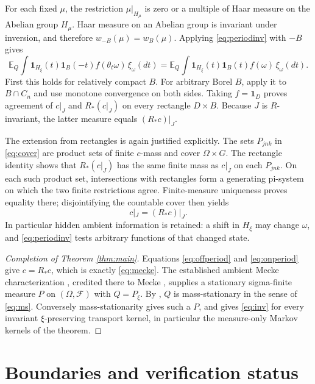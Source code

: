 \documentclass[11pt]{article}
\newcommand{\FF}{\mathcal F}
\newcommand{\ind}{\mathbf 1}
\newcommand{\EQ}{\mathbb E_Q}
\begin{document}
For each fixed $\mu$, the restriction $\mu|_{H_\mu}$ is zero or a multiple of Haar measure on the Abelian group $H_\mu$. Haar measure on an Abelian group is invariant under inversion, and therefore $w_{-B}(\mu)=w_B(\mu)$. Applying \eqref{eq:periodinv} with $-B$ gives
\begin{equation}
 \EQ\int\ind_{H_\xi}(t)\ind_B(-t)f(\theta_t\omega)\,\xi_\omega(dt)
 =\EQ\int\ind_{H_\xi}(t)\ind_B(t)f(\omega)\,\xi_\omega(dt). \label{eq:periodrect}
\end{equation}
First this holds for relatively compact $B$. For arbitrary Borel $B$, apply it to $B\cap C_n$ and use monotone convergence on both sides. Taking $f=\ind_D$ proves agreement of $c|_J$ and $R_*(c|_J)$ on every rectangle $D\times B$. Because $J$ is $R$-invariant, the latter measure equals $(R_*c)|_J$.

The extension from rectangles is again justified explicitly. The sets $P_{jnk}$ in \eqref{eq:cover} are product sets of finite $c$-mass and cover $\Omega\times G$. The rectangle identity shows that $R_*(c|_J)$ has the same finite mass as $c|_J$ on each $P_{jnk}$. On each such product set, intersections with rectangles form a generating pi-system on which the two finite restrictions agree. Finite-measure uniqueness proves equality there; disjointifying the countable cover then yields
\begin{equation}
 c|_J=(R_*c)|_J. \label{eq:onperiod}
\end{equation}
In particular hidden ambient information is retained: a shift in $H_\xi$ may change $\omega$, and \eqref{eq:periodinv} tests arbitrary functions of that changed state.

\begin{proof}[Completion of Theorem \ref{thm:main}]
Equations \eqref{eq:offperiod} and \eqref{eq:onperiod} give $c=R_*c$, which is exactly \eqref{eq:mecke}. The established ambient Mecke characterization \cite[(2.7)]{LT09}, credited there to Mecke \cite{Mecke67}, supplies a stationary sigma-finite measure $P$ on $(\Omega,\FF)$ with $Q=P_\xi$. By \cite[Theorem 6.3]{LT09}, $Q$ is mass-stationary in the sense of \eqref{eq:ms}. Conversely mass-stationarity gives such a $P$, and \cite[Theorem 4.1]{LT09} gives \eqref{eq:inv} for every invariant $\xi$-preserving transport kernel, in particular the measure-only Markov kernels of the theorem.
\end{proof}

\section{Boundaries and verification status}
\end{document}
